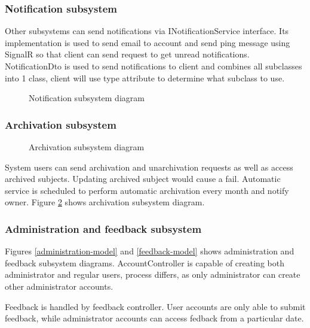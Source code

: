 \documentclass[
    english, %
]{VUMIFPSkursinis}
\begin{document}
\subsubsection{Notification subsystem}

Other subsystems can send notifications via INotificationService interface. Its implementation is used to send email to account and send ping message using SignalR so that client can send request to get unread notifications. NotificationDto is used to send notifications to client and combines all subclasses into 1 class, client will use type attribute to determine what subclass to use.

\begin{figure}[ht]
    \centering
    
    \caption{Notification subsystem diagram}
    \label{notification-model}
\end{figure}

\subsubsection{Archivation subsystem}

\begin{figure}[ht]
    \centering
    
    \caption{Archivation subsystem diagram}
    \label{archivation-model}
\end{figure}

System users can send archivation and unarchivation requests as well as access archived subjects. Updating archived subject would cause a fail. Automatic service is scheduled to perform automatic archivation every month and notify owner. Figure \ref{archivation-model} shows archivation subsystem diagram.

\subsubsection{Administration and feedback subsystem}

Figures \ref{administration-model} and \ref{feedback-model} shows administration and feedback subsystem diagrams. AccountController is capable of creating both administrator and regular users, process differs, as only administrator can create other administrator accounts.

Feedback is handled by feedback controller. User accounts are only able to submit feedback, while administrator accounts can access fedback from a particular date.
\end{document}
